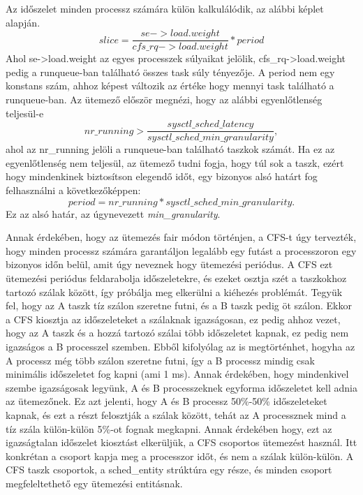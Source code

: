 
Az időszelet minden processz számára külön kalkulálódik, az alábbi képlet alapján.
\begin{equation}
slice = \frac{se->load.weight}{cfs\_rq->load.weight}*period
\end{equation}
Ahol se->load.weight az egyes processzek súlyaikat jelölik, cfs\_rq->load.weight pedig a runqueue-ban található összes task súly tényezője. A period nem egy konstans szám, ahhoz képest változik az értéke hogy mennyi task található a runqueue-ban. 
Az ütemező először megnézi, hogy az alábbi egyenlőtlenség teljesül-e
\begin{equation}
nr\_running > \frac{sysctl\_sched\_latency}{sysctl\_sched\_min\_granularity},
\end{equation}
ahol az nr\_running jelöli a runqueue-ban található taszkok számát. Ha ez az egyenlőtlenség nem teljesül, az ütemező tudni fogja, hogy túl sok a taszk, ezért hogy mindenkinek biztosítson elegendő időt, egy bizonyos alsó határt fog felhasználni a következőképpen:
\begin{equation}
period =  nr\_running * sysctl\_sched\_min\_granularity.
\end{equation}
Ez az alsó határ, az úgynevezett \textit{min\_granularity}.



Annak érdekében, hogy az ütemezés fair módon történjen, a CFS-t úgy tervezték, hogy minden processz számára garantáljon legalább egy futást a processzoron egy bizonyos időn belül, amit úgy neveznek hogy ütemezési periódus.
A CFS ezt ütemezési periódus feldarabolja időszeletekre, és ezeket osztja szét a taszkokhoz tartozó szálak között, így próbálja meg elkerülni a kiéhezés problémát.
Tegyük fel, hogy az A taszk tíz szálon szeretne futni, és a B taszk pedig öt szálon. Ekkor a CFS kiosztja az időszeleteket a szálaknak igazságosan, ez pedig ahhoz vezet, hogy az A taszk és a hozzá tartozó szálai több időszeletet kapnak, ez pedig nem igazságos a B processzel szemben.
Ebből kifolyólag az is megtörténhet, hogyha az A processz még több szálon szeretne futni, így a B processz mindig csak minimális időszeletet fog kapni (ami 1 ms). Annak érdekében, hogy mindenkivel szembe igazságosak legyünk, A és B processzeknek egyforma időszeletet kell adnia az ütemezőnek. Ez azt jelenti, hogy A és B processz 50\%-50\% időszeleteket kapnak, és ezt a részt felosztják a szálak között, tehát az A processznek mind a tíz szála külön-külön 5\%-ot fognak megkapni.
Annak érdekében hogy, ezt az igazságtalan időszelet kiosztást elkerüljük, a CFS csoportos ütemezést használ. Itt konkrétan a csoport kapja meg a processzor időt, és nem a szálak külön-külön.
A CFS taszk csoportok, a sched\_entity strúktúra egy része, és minden csoport megfeleltethető egy ütemezési entitásnak.


